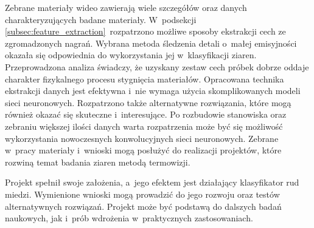 Zebrane materiały wideo zawierają wiele szczegółów oraz danych
charakteryzujących badane materiały.
W~podsekcji \ref{subsec:feature_extraction}~rozpatrzono możliwe sposoby
ekstrakcji cech ze zgromadzonych nagrań.
Wybrana metoda śledzenia detali o~małej emisyjności okazała się odpowiednia
do wykorzystania jej w~klasyfikacji ziaren.
Przeprowadzona analiza świadczy, że uzyskany zestaw cech próbek dobrze oddaje
charakter fizykalnego procesu stygnięcia materiałów.
Opracowana technika ekstrakcji danych jest efektywna i~nie wymaga użycia
skomplikowanych modeli sieci neuronowych.
Rozpatrzono także alternatywne rozwiązania, które mogą również okazać się
skuteczne i~interesujące.
Po rozbudowie stanowiska oraz zebraniu większej ilości danych warta rozpatrzenia
może być się możliwość wykorzystania nowoczesnych konwolucyjnych sieci
neuronowych.
Zebrane w~pracy materiały i~wnioski mogą posłużyć do realizacji projektów, które
rozwiną temat badania ziaren metodą termowizji.

Projekt spełnił swoje założenia, a~jego efektem jest działający klasyfikator rud
miedzi.
Wymienione wnioski mogą prowadzić do jego rozwoju oraz testów alternatywnych
rozwiązań.
Projekt może być podstawą do dalszych badań naukowych, jak i~prób wdrożenia
w~praktycznych zastosowaniach.
